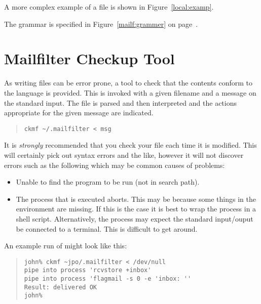 A more complex example of a  file is shown in
Figure~\ref{local:examp}.


The grammar is specified in Figure~\ref{mailf:grammer} on
page~\pageref{mailf:grammer}.


\section{Mailfilter Checkup Tool}

As writing  files can be error prone, a tool to
check that the contents conform to the language is provided. This is
invoked with a given filename and a message on the standard input. The
file is parsed and then interpreted and the actions appropriate for
the given message are indicated.

\begin{quote}\small\begin{verbatim}
ckmf ~/.mailfilter < msg
\end{verbatim}\end{quote}

It is {\em strongly} recommended that you check your
 file each time it is modified.
This will certainly pick out syntax errors and the like, however it
will not discover errors such as the following which may be common
causes of problems:
\begin{itemize}
\pagebreak[3]
\item	Unable to find the program to be run (not in search path).
\item	The process that is executed aborts. This may be because some
things in the environment are missing. If this is the case it is best
to wrap the process in a shell script. Alternatively, the process may
expect the standard input/ouput be connected to a terminal. This is
difficult to get around.
\end{itemize}

An example run of  might look like this:
\begin{quote}\small\begin{verbatim}
john% ckmf ~jpo/.mailfilter < /dev/null
pipe into process 'rcvstore +inbox'
pipe into process 'flagmail -s 0 -e 'inbox: ''
Result: delivered OK
john%
\end{verbatim}\end{quote}

